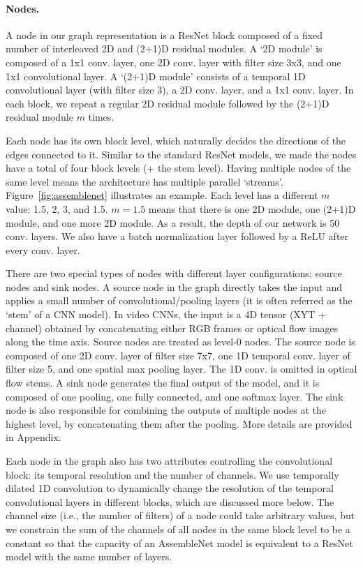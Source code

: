\documentclass{article} \usepackage{iclr2020_conference,times}
\begin{document}
\vspace{-5pt}
\paragraph{Nodes.}

A node in our graph representation is a ResNet block composed of a fixed number of interleaved 2D and (2+1)D residual modules. 
A `2D module' is composed of a 1x1 conv. layer, one 2D conv. layer with filter size 3x3, and one 1x1 convolutional layer.
A `(2+1)D module' consists of a temporal 1D convolutional layer (with filter size 3), a 2D conv. layer, and a 1x1 conv. layer. In each block, we repeat a regular 2D residual module followed by the (2+1)D residual module $m$ times.

Each node has its own block level, which naturally decides the directions of the edges connected to it. Similar to the standard ResNet models, we made the nodes have a total of four block levels (+ the stem level). Having multiple nodes of the same level means the architecture has multiple parallel `streams'. Figure~\ref{fig:assemblenet} illustrates an example. Each level has a different $m$ value: 1.5, 2, 3, and 1.5. $m=1.5$ means that there is one 2D module, one (2+1)D module, and one more 2D module. As a result, the depth of our network is 50 conv. layers. We also have a batch normalization layer followed by a ReLU after every conv. layer.

There are two special types of nodes with different layer configurations: source nodes and sink nodes. A source node in the graph directly takes the input and applies a small number of convolutional/pooling layers (it is often referred as the `stem' of a CNN model). In video CNNs, the input is a 4D tensor (XYT + channel) obtained by concatenating either RGB frames or optical flow images along the time axis.  Source nodes are treated as level-0 nodes.
The source node is composed of one 2D conv. layer of filter size 7x7, one 1D temporal conv. layer of filter size 5, and one spatial max pooling layer. The 1D conv. is omitted in optical flow stems. A sink node generates the final output of the model, and it is composed of one pooling, one fully connected, and one softmax layer. The sink node is also responsible for combining the outputs of multiple nodes at the highest level, by concatenating them after the pooling. More details are provided in Appendix.

Each node in the graph also has two attributes controlling the convolutional block: its temporal resolution and the number of channels. We use temporally dilated 1D convolution to dynamically change the resolution of the temporal convolutional layers in different blocks, which are discussed more below. The channel size (i.e., the number of filters) of a node could take arbitrary values, but we constrain the sum of the channels of all nodes in the same block level to be a constant so that the capacity of an AssembleNet model is equivalent to a ResNet model with the same number of layers.
\end{document}
